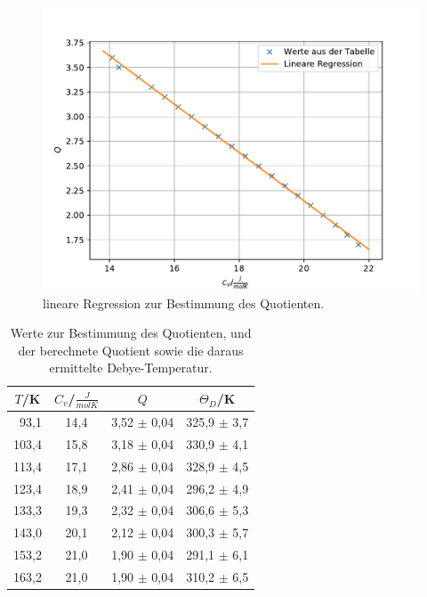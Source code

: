 \begin{figure}
  \centering
  \includegraphics{Q.pdf}
  \caption{lineare Regression zur Bestimmung des Quotienten.}
  \label{fig:Q}
\end{figure}
\FloatBarrier

\begin{table}
    \centering
    \caption{Werte zur Bestimmung des Quotienten, und der berechnete Quotient sowie die daraus ermittelte Debye-Temperatur.}
    \label{TabTd}
    \begin{tabular}{S S S[table-format=2.2] S } %
      \toprule
       {$T$/K} & {$C_{\si{v}}$/$\frac{\si{J}}{\si{molK}}$} & {$Q$} & {$\Theta_{\si{D}}$/K} \\
      \midrule
      \midrule
        {~93,1} & {14,4}& {3,52 $\pm$ 0,04} & {325,9 $\pm$ 3,7} \\
        {103,4} & {15,8}& {3,18 $\pm$ 0,04} & {330,9 $\pm$ 4,1} \\
        {113,4} & {17,1}& {2,86 $\pm$ 0,04} & {328,9 $\pm$ 4,5} \\
        {123,4} & {18,9}& {2,41 $\pm$ 0,04} & {296,2 $\pm$ 4,9} \\
        {133,3} & {19,3}& {2,32 $\pm$ 0,04} & {306,6 $\pm$ 5,3} \\
        {143,0} & {20,1}& {2,12 $\pm$ 0,04} & {300,3 $\pm$ 5,7} \\
        {153,2} & {21,0}& {1,90 $\pm$ 0,04} & {291,1 $\pm$ 6,1} \\
        {163,2} & {21,0}& {1,90 $\pm$ 0,04} & {310,2 $\pm$ 6,5} \\
      \bottomrule
    \end{tabular}
\end{table}
\FloatBarrier

